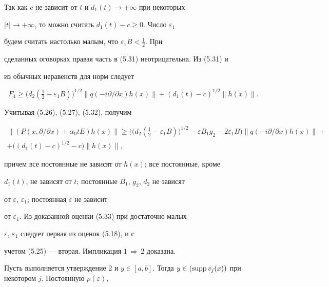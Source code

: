 Так как $c$ не зависит от $t$ и $d_1(t)\to+\infty$ при некоторых 


$|t|\to+\infty$, то можно считать $d_1(t)-c\ge0$. Число $\varepsilon_1$ 


будем считать настолько малым, что $\varepsilon_1B<\frac{1}{2}$. При 


сделанных оговорках правая часть в (5.31) неотрицательна. Из (5.31) и 


из обычных неравенств для норм следует 


\begin{equation} 


F_4\ge\big(d_2(\tfrac{1}{2}-\varepsilon_1B)\big)^{1/2} 


\|q(-i\partial/\partial x)h(x)\|+ 


(d_1(t)-c)^{1/2}\|h(x)\|. 


\end{equation} 


Учитывая (5.26), (5.27), (5.32), получим 


\begin{multline} 


\|(P(x,\partial/\partial x)+\alpha_0t E)h(x)\|\ge\Big(\big(d_2(\tfrac{1}{2}- 


\varepsilon_1B)\big)^{1/2}-\varepsilon B_1g_2- 


2\varepsilon_1B\Big)\|q(-i\partial/\partial x)h(x)\|+ \\


%


+\big((d_1(t)-c)^{1/2}-c\big)\|h(x)\|, 


\end{multline} 


причем все постоянные не зависят от $h(x)$; все постоянные, кроме 


$d_1(t)$, не зависят от $t$; постоянные $B_1$, $g_2$, $d_2$ не зависят 


от $\varepsilon$, $\varepsilon_1$; постоянная $\varepsilon$ не зависит 


от $\varepsilon_1$. Из доказанной оценки (5.33) при достаточно малых 


$\varepsilon$, $\varepsilon_1$ следует первая из оценок (5.18), и с 


учетом (5.25) --- вторая. Импликация $1\,\Rightarrow\,2$ доказана. 


 


Пусть выполняется утверждение 2 и $y\in[a,b]$. Тогда $y\in(\supp 


v_j(x))$ при некотором $j$. Постоянную $\rho(\varepsilon)$, 


